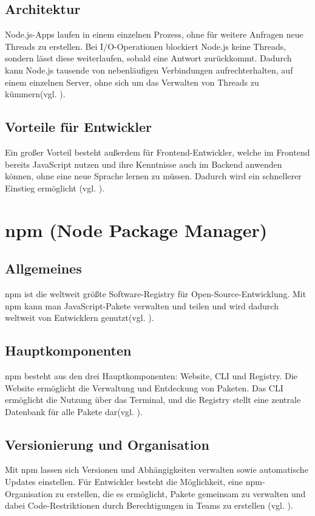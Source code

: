 \documentclass[oneside]{ausarbeitung}
\begin{document}
\subsection{Architektur}
Node.js-Apps laufen in einem einzelnen Prozess, ohne für weitere Anfragen neue Threads zu erstellen. Bei I/O-Operationen blockiert Node.js keine Threads, sondern lässt diese weiterlaufen, sobald eine Antwort zurückkommt. Dadurch kann Node.js tausende von nebenläufigen Verbindungen aufrechterhalten, auf einem einzelnen Server, ohne sich um das Verwalten von Threads zu kümmern(vgl. \parencite{node.js}).

\subsection{Vorteile für Entwickler}
Ein großer Vorteil besteht außerdem für Frontend-Entwickler, welche im Frontend bereits JavaScript nutzen und ihre Kenntnisse auch im Backend anwenden können, ohne eine neue Sprache lernen zu müssen. Dadurch wird ein schnellerer Einstieg ermöglicht (vgl. \parencite{node.js}).

\section{npm (Node Package Manager)}
\subsection{Allgemeines}
npm ist die weltweit größte Software-Registry für Open-Source-Entwicklung. Mit npm kann man JavaScript-Pakete verwalten und teilen und wird dadurch weltweit von Entwicklern genutzt(vgl. \parencite{npm}). 

\subsection{Hauptkomponenten}
npm besteht aus den drei Hauptkomponenten: Website, CLI und Registry. Die Website ermöglicht die Verwaltung und Entdeckung von Paketen. Das CLI ermöglicht die Nutzung über das Terminal, und die Registry stellt eine zentrale Datenbank für alle Pakete dar(vgl. \parencite{npm}).

\subsection{Versionierung und Organisation}
Mit npm lassen sich Versionen und Abhängigkeiten verwalten sowie automatische Updates einstellen. Für Entwickler besteht die Möglichkeit, eine npm-Organisation zu erstellen, die es ermöglicht, Pakete gemeinsam zu verwalten und dabei Code-Restriktionen durch Berechtigungen in Teams zu erstellen (vgl. \parencite{npm}).
\end{document}

